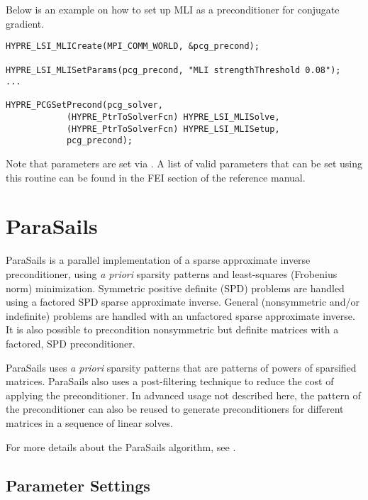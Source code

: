 Below is an example on how to set up MLI as a preconditioner
for conjugate gradient.

\begin{display}\begin{verbatim}
HYPRE_LSI_MLICreate(MPI_COMM_WORLD, &pcg_precond);

HYPRE_LSI_MLISetParams(pcg_precond, "MLI strengthThreshold 0.08");
...

HYPRE_PCGSetPrecond(pcg_solver,
		    (HYPRE_PtrToSolverFcn) HYPRE_LSI_MLISolve,
		    (HYPRE_PtrToSolverFcn) HYPRE_LSI_MLISetup,
		    pcg_precond);
\end{verbatim}\end{display}

\noindent
Note that parameters are set via . A list of
valid parameters that can be set using this routine can be found in the
FEI section of the reference manual.




\section{ParaSails}

ParaSails is a parallel implementation of a sparse approximate inverse
preconditioner, using {\em a priori} sparsity patterns and least-squares
(Frobenius norm) minimization.  Symmetric positive definite (SPD) problems
are handled using a factored SPD sparse approximate inverse.  General
(nonsymmetric and/or indefinite) problems are handled with an
unfactored sparse approximate inverse.  It is also possible to
precondition nonsymmetric but definite matrices with a factored, SPD
preconditioner.

ParaSails uses {\em a priori} sparsity patterns that are patterns of powers
of sparsified matrices.  ParaSails also uses a post-filtering technique
to reduce the cost of applying the preconditioner.  
In advanced usage not described here, the pattern of the
preconditioner can also be reused to generate preconditioners for different
matrices in a sequence of linear solves.

For more details about the ParaSails algorithm, see \cite{EChow_2000}.


\subsection{Parameter Settings}

